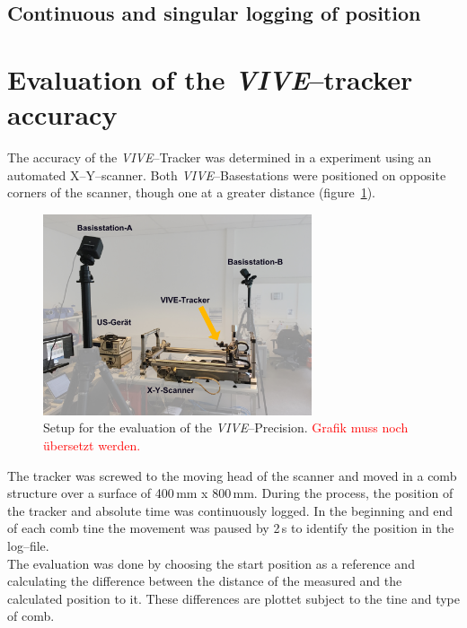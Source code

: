 \documentclass{VRARWorkshop}
\begin{document}
\subsection{Continuous and singular logging of position}

\section{Evaluation of the \textit{VIVE}--tracker accuracy}
The accuracy of the \textit{VIVE}--Tracker was determined in a experiment using an automated X--Y--scanner.
Both \textit{VIVE}--Basestations were positioned on opposite corners of the scanner, though one at a greater distance (figure~\ref{fig:precisionMeasurementSetup}).

\begin{figure}[h!]
    \begin{center}
        \includegraphics[width=79mm]{images/PrecisionMeasurement.jpg}
        \caption{\label{fig:precisionMeasurementSetup} Setup for the evaluation of the \textit{VIVE}--Precision. \textcolor{red}{Grafik muss noch übersetzt werden.}}
    \end{center}
\end{figure}

The tracker was screwed to the moving head of the scanner and moved in a comb structure over a surface of 400\,mm x 800\,mm.
During the process, the position of the tracker and absolute time was continuously logged.
In the beginning and end of each comb tine the movement was paused by 2\,s to identify the position in the log--file.\\

The evaluation was done by choosing the start position as a reference and calculating the difference between the distance of the measured and the calculated position to it.
These differences are plottet subject to the tine and type of comb.
\end{document}
